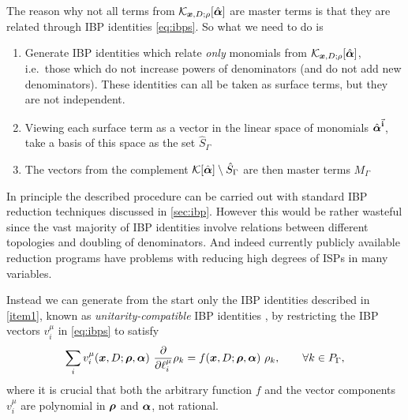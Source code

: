 The reason why not all terms from $\mathcal{K}_{\vb*{x},D;\rho}[\hat{\vb*{\alpha}}]$ are master terms is that they are
related through IBP identities \eqref{eq:ibps}. So what we need to do is
\begin{enumerate}
  \item Generate IBP identities which relate
    \emph{only} monomials from $\mathcal{K}_{\vb*{x},D;\rho}[\hat{\vb*{\alpha}}]$, i.e.\ those which do not increase powers of denominators (and do not add new denominators).
    These identities can all be taken as surface terms, but they are not independent. 
    \label{item1}
  \item  Viewing each surface term as a vector in the linear space of monomials $\hat{\vb*{\alpha}}^{\va{i}}$, take
    a basis of this space as the set $\hat{S}_\Gamma$
    \label{item2}
  \item The vectors from the complement $\mathcal{K}[\hat{\vb*{\alpha}}]\setminus \hat{S}_\Gamma$ are then master terms $M_\Gamma$
    \label{item3}
\end{enumerate}

In principle the described procedure can be carried out with standard IBP reduction techniques discussed in \cref{sec:ibp}.
However this would be rather wasteful
since the vast majority of IBP identities involve relations between different topologies and doubling of denominators.
And indeed currently publicly available reduction programs
\cite{Studerus:2009ye,vonManteuffel:2012np, Smirnov:2008iw,Smirnov:2014hma, Lee:2012cn,Lee:2013mka, Maierhoefer:2017hyi,Maierhofer:2018gpa}
have problems with reducing high degrees of ISPs in many variables.

Instead we can generate from the start only the IBP identities described in \cref{item1},
known as \emph{unitarity-compatible} IBP identities \cite{Gluza:2010ws,Schabinger:2011dz,Ita:2015tya}, by
restricting the IBP vectors $v_i^\mu$ in \cref{eq:ibps} to satisfy
\begin{equation} \label{eq:non_doubling_ibp_vectors}
  \sum_i v_i^\mu(\vb*{x},D;\vb*{\rho},\vb*{\alpha}) ~ \pdv{\ell^\mu_i} \rho_k = f(\vb*{x},D;\vb*{\rho},\vb*{\alpha}) ~ \rho_k, \qquad \forall k\in P_\Gamma,
\end{equation}
where it is crucial that both the arbitrary function $f$ and the vector components $v_i^\mu$ are polynomial in $\vb*{\rho}$ and $\vb*{\alpha}$, not rational.

